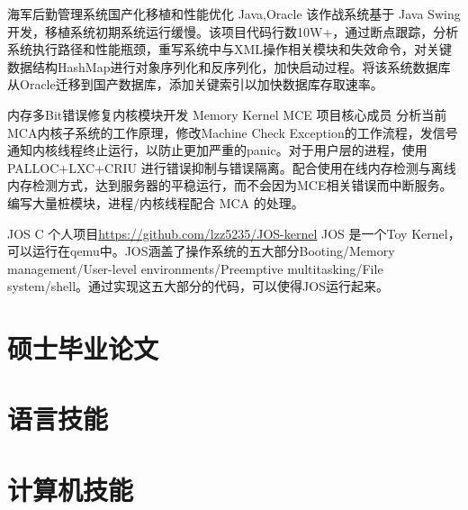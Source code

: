 \documentclass[11pt,a4paper]{moderncv}
\begin{document}
{海军后勤管理系统国产化移植和性能优化}
{Java,Oracle}
{}{}
{该作战系统基于 Java Swing 开发，移植系统初期系统运行缓慢。该项目代码行数10W+，通过断点跟踪，分析系统执行路径和性能瓶颈，重写系统中与XML操作相关模块和失效命令，对关键数据结构HashMap进行对象序列化和反序列化，加快启动过程。将该系统数据库从Oracle迁移到国产数据库，添加关键索引以加快数据库存取速率。}

{内存多Bit错误修复内核模块开发}
{Memory Kernel MCE}
{}{项目核心成员}
{分析当前MCA内核子系统的工作原理，修改Machine Check Exception的工作流程，发信号通知内核线程终止运行，以防止更加严重的panic。对于用户层的进程，使用PALLOC+LXC+CRIU 进行错误抑制与错误隔离。配合使用在线内存检测与离线内存检测方式，达到服务器的平稳运行，而不会因为MCE相关错误而中断服务。编写大量桩模块，进程/内核线程配合 MCA 的处理。}

{JOS}
{C}
{个人项目}{\url{https://github.com/lzz5235/JOS-kernel}}
{JOS 是一个Toy Kernel，可以运行在qemu中。JOS涵盖了操作系统的五大部分Booting/Memory management/User-level environments/Preemptive multitasking/File system/shell。通过实现这五大部分的代码，可以使得JOS运行起来。}

\section{硕士毕业论文}


\section{语言技能}

\section{计算机技能}
\end{document}

